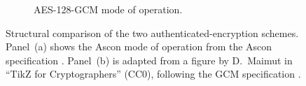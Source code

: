 \begin{figure}[p]
\begin{subfigure}{\textwidth}
{%
    }
    \caption{AES-128-GCM mode of operation.}
    \label{fig:scheme-gcm}
  \end{subfigure}

  \caption{Structural comparison of the two authenticated-encryption schemes.
    Panel~(a) shows the Ascon mode of operation from the Ascon specification
    \cite{ASCONSpec}. Panel~(b) is adapted from a figure by D.~Maimut in
    ``TikZ for Cryptographers'' \cite{jean2016tikz} (CC0), following the GCM
    specification \cite{NISTSP80038D}.}
  \label{fig:scheme-comparison}
\end{figure}
